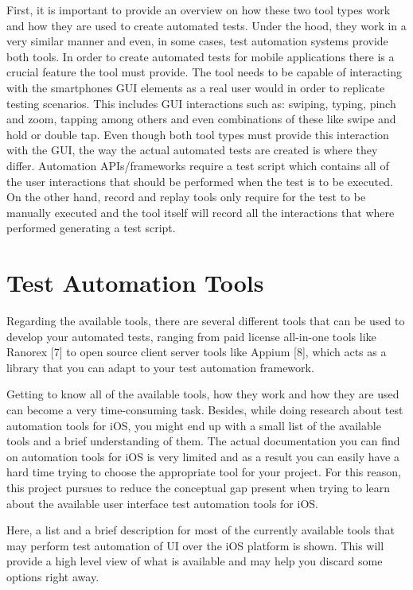First, it is important to provide an overview on how these two tool types work and how they are used to create automated tests. Under the hood, they work in a very similar manner and even, in some cases, test automation systems provide both tools. In order to create automated tests for mobile applications there is a crucial feature the tool must provide. The tool needs to be capable of interacting with the smartphones GUI elements as a real user would in order to replicate testing scenarios. This includes GUI interactions such as: swiping, typing, pinch and zoom, tapping among others and even combinations of these like swipe and hold or double tap. Even though both tool types must provide this interaction with the GUI, the way the actual automated tests are created is where they differ. Automation APIs/frameworks require a test script which contains all of the user interactions that should be performed when the test is to be executed. On the other hand, record and replay tools only require for the test to be manually executed and the tool itself will record all the interactions that where performed generating a test script.


\section{Test Automation Tools}

Regarding the available tools, there are several different tools that can be used to develop your automated tests, ranging from paid license all-in-one tools like Ranorex [7] to open source client server tools like Appium [8], which acts as a library that you can adapt to your test automation framework. 

Getting to know all of the available tools, how they work and how they are used can become a very time-consuming task. Besides, while doing research about test automation tools for iOS, you might end up with a small list of the available tools and a brief understanding of them. The actual documentation you can find on automation tools for iOS is very limited and as a result you can easily have a hard time trying to choose the appropriate tool for your project. For this reason, this project pursues to reduce the conceptual gap present when trying to learn about the available user interface test automation tools for iOS.

Here, a list and a brief description for most of the currently available tools that may perform test automation of UI over the iOS platform is shown. This will provide a high level view of what is available and may help you discard some options right away.


